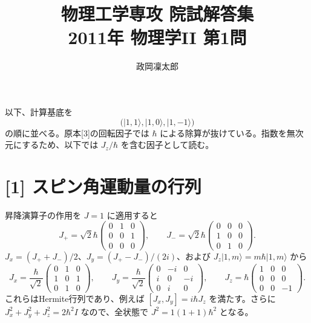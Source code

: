 \documentclass[11pt,a4paper]{article}
\title{物理工学専攻 院試解答集\\2011年 物理学II 第1問}
\author{政岡凜太郎}
\date{}
\begin{document}
\maketitle

以下、計算基底を
\begin{equation}
  \bigl(|1,1\rangle,|1,0\rangle,|1,-1\rangle\bigr)
\end{equation}
の順に並べる。原本[3]の回転因子では $\hbar$ による除算が抜けている。指数を無次元にするため、以下では $J_z/\hbar$ を含む因子として読む。

\section*{[1] スピン角運動量の行列}
昇降演算子の作用を $J=1$ に適用すると
\begin{equation}
  J_+=\sqrt{2}\hbar
  \begin{pmatrix}0&1&0\\0&0&1\\0&0&0\end{pmatrix},\qquad
  J_-=\sqrt{2}\hbar
  \begin{pmatrix}0&0&0\\1&0&0\\0&1&0\end{pmatrix}.
\end{equation}
$J_x=(J_++J_-)/2$、$J_y=(J_+-J_-)/(2i)$、および $J_z|1,m\rangle=m\hbar|1,m\rangle$ から
\begin{equation}
  \boxed{J_x=\frac{\hbar}{\sqrt{2}}
  \begin{pmatrix}0&1&0\\1&0&1\\0&1&0\end{pmatrix}},\qquad
  \boxed{J_y=\frac{\hbar}{\sqrt{2}}
  \begin{pmatrix}0&-i&0\\i&0&-i\\0&i&0\end{pmatrix}},\qquad
  \boxed{J_z=\hbar
  \begin{pmatrix}1&0&0\\0&0&0\\0&0&-1\end{pmatrix}}.
\end{equation}
これらはHermite行列であり、例えば $[J_x,J_y]=i\hbar J_z$ を満たす。さらに $J_x^2+J_y^2+J_z^2=2\hbar^2 I$ なので、全状態で $J^2=1(1+1)\hbar^2$ となる。
\end{document}
